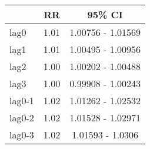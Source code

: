 \begin{table}[ht]
\centering
\begin{tabular}{l|cc}
  \hline
 & RR & 95\% CI \\ 
  \hline
lag0 & 1.01 & 1.00756 - 1.01569 \\ 
  lag1 & 1.01 & 1.00495 - 1.00956 \\ 
  lag2 & 1.00 & 1.00202 - 1.00488 \\ 
  lag3 & 1.00 & 0.99908 - 1.00243 \\ 
  lag0-1 & 1.02 & 1.01262 - 1.02532 \\ 
  lag0-2 & 1.02 & 1.01528 - 1.02971 \\ 
  lag0-3 & 1.02 & 1.01593 - 1.0306 \\ 
   \hline
\end{tabular}
\end{table}
